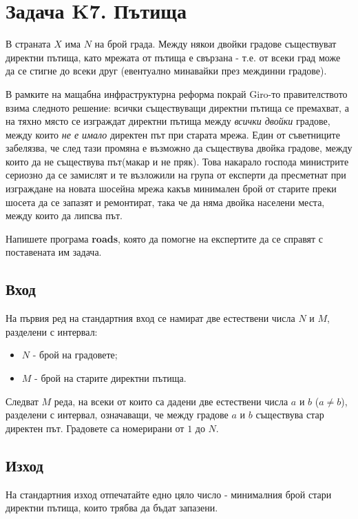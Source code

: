 \documentclass[12pt]{article}
\begin{document}
\section{Задача K7. Пътища}

В страната $X$ има $N$ на брой града. Между някои двойки градове съществуват директни пътища, като мрежата от пътища е свързана - т.е. от всеки град може да се стигне до всеки друг (евентуално минавайки през междинни градове).

В рамките на мащабна инфраструктурна реформа покрай Giro-то правителството взима следното решение: всички съществуващи директни пътища се премахват, а на тяхно място се изграждат директни пътища между \emph{всички двойки} градове, между които \emph{не е имало} директен път при старата мрежа. Един от съветниците забелязва, че след тази промяна е възможно да съществува двойка градове, между които да не съществува път(макар и не пряк). Това накарало господа
министрите сериозно да се замислят и те възложили на група от експерти да пресметнат при изграждане на новата шосейна мрежа какъв минимален брой от старите преки шосета да се запазят и ремонтират, така че да няма двойка
населени места, между които да липсва път.

Напишете програма \textbf{roads}, която да помогне на експертите да се справят с поставената им задача.

\subsection{Вход}

На първия ред на стандартния вход се намират две естествени числа $N$ и $M$,
разделени с интервал:
\begin{itemize}
	\item $N$ - брой на градовете;
	\item $M$ - брой на старите директни пътища.
\end{itemize}

Следват $M$ реда, на всеки от които са дадени две естествени числа $a$ и $b$ ($a \neq b$), разделени с интервал, означаващи, че между градове $a$ и $b$ съществува стар директен път. Градовете са номерирани от $1$ до $N$.

\subsection{Изход}

На стандартния изход отпечатайте едно цяло число - минималния брой стари директни пътища, които трябва да бъдат запазени.
\end{document}
